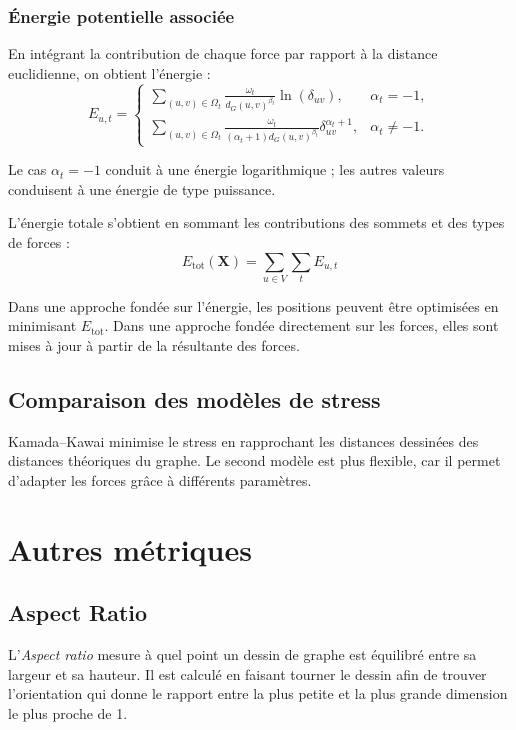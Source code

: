 \documentclass[a4paper,11pt]{article}
\begin{document}
\subsubsection{Énergie potentielle associée}

En intégrant la contribution de chaque force par rapport
à la distance euclidienne, on obtient l'énergie :
\[
\boxed{
E_{u,t}
=
\begin{cases}
\displaystyle
\sum_{(u,v)\in\Omega_t}
\frac{\omega_t}{d_G(u,v)^{\beta_t}}
\ln(\delta_{uv}),
& \alpha_t=-1,\\[12pt]
\displaystyle
\sum_{(u,v)\in\Omega_t}
\frac{\omega_t}
{(\alpha_t+1)d_G(u,v)^{\beta_t}}
\delta_{uv}^{\alpha_t+1},
& \alpha_t\neq -1.
\end{cases}
}
\]

Le cas $\alpha_t=-1$ conduit à une énergie logarithmique ;
les autres valeurs conduisent à une énergie de type puissance.

L'énergie totale s'obtient en sommant les contributions
des sommets et des types de forces :
\[
\boxed{
E_{\mathrm{tot}}(\mathbf{X})
=
\sum_{u\in V}\sum_t E_{u,t}
}
\]

Dans une approche fondée sur l'énergie, les positions
peuvent être optimisées en minimisant $E_{\mathrm{tot}}$.
Dans une approche fondée directement sur les forces,
elles sont mises à jour à partir de la résultante des forces.

\subsection{Comparaison des modèles de stress}

Kamada--Kawai minimise le stress en rapprochant les distances dessinées des distances théoriques du graphe. Le second modèle est plus flexible, car il permet d'adapter les forces grâce à différents paramètres.

\section{Autres métriques}

\subsection{Aspect Ratio}

L'\textit{Aspect ratio} mesure à quel point un dessin de graphe est équilibré entre sa largeur et sa hauteur. Il est calculé en faisant tourner le dessin afin de trouver l'orientation qui donne le rapport entre la plus petite et la plus grande dimension le plus proche de 1.
\end{document}
